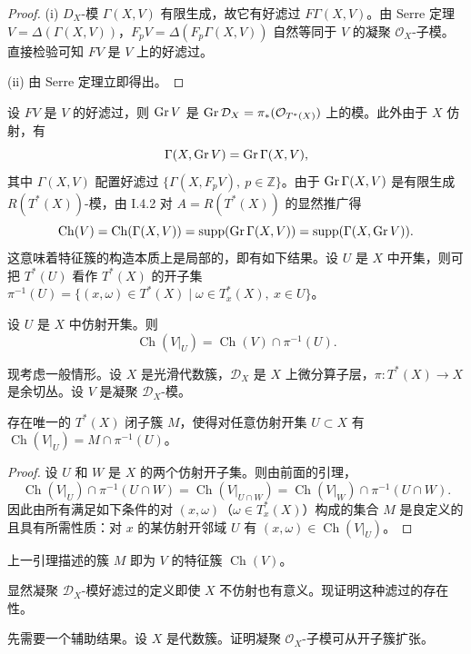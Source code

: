 \begin{proof}
(i) $D_X$-模 $\Gamma(X,V)$ 有限生成，故它有好滤过 $F\Gamma(X,V)$。由 Serre 定理 $V=\Delta(\Gamma(X,V))$，$F_pV=\Delta(F_p\Gamma(X,V))$ 自然等同于 $V$ 的凝聚 $\mathcal{O}_X$-子模。直接检验可知 $F V$ 是 $V$ 上的好滤过。

(ii) 由 Serre 定理立即得出。
\end{proof}

设 $F V$ 是 $V$ 的好滤过，则 $\operatorname{Gr} V$ 是 $\operatorname{Gr}\mathcal{D}_X=\pi_*(\mathcal{O}_{T^*(X)})$ 上的模。此外由于 $X$ 仿射，有
$$\Gamma(X,\operatorname{Gr} V)=\operatorname{Gr}\Gamma(X,V),$$
其中 $\Gamma(X,V)$ 配置好滤过 $\{\Gamma(X,F_pV),\ p\in\mathbb{Z}\}$。由于 $\operatorname{Gr}\Gamma(X,V)$ 是有限生成 $R(T^*(X))$-模，由 I.4.2 对 $A=R(T^*(X))$ 的显然推广得
$$\operatorname{Ch}(V)=\operatorname{Ch}(\Gamma(X,V))=\operatorname{supp}(\operatorname{Gr}\Gamma(X,V))=\operatorname{supp}(\Gamma(X,\operatorname{Gr} V)).$$
这意味着特征簇的构造本质上是局部的，即有如下结果。设 $U$ 是 $X$ 中开集，则可把 $T^*(U)$ 看作 $T^*(X)$ 的开子集 $\pi^{-1}(U)=\{(x,\omega)\in T^*(X)\mid \omega\in T_x^*(X),\ x\in U\}$。

\begin{lemma}
设 $U$ 是 $X$ 中仿射开集。则
$$\operatorname{Ch}(V|_U)=\operatorname{Ch}(V)\cap\pi^{-1}(U).$$
\end{lemma}

现考虑一般情形。设 $X$ 是光滑代数簇，$\mathcal{D}_X$ 是 $X$ 上微分算子层，$\pi:T^*(X)\to X$ 是余切丛。设 $V$ 是凝聚 $\mathcal{D}_X$-模。

\begin{lemma}
存在唯一的 $T^*(X)$ 闭子簇 $M$，使得对任意仿射开集 $U\subset X$ 有 $\operatorname{Ch}(V|_U)=M\cap\pi^{-1}(U)$。
\end{lemma}

\begin{proof}
设 $U$ 和 $W$ 是 $X$ 的两个仿射开子集。则由前面的引理，
$$\operatorname{Ch}(V|_U)\cap\pi^{-1}(U\cap W)=\operatorname{Ch}(V|_{U\cap W})=\operatorname{Ch}(V|_W)\cap\pi^{-1}(U\cap W).$$
因此由所有满足如下条件的对 $(x,\omega)$（$\omega\in T_x^*(X)$）构成的集合 $M$ 是良定义的且具有所需性质：对 $x$ 的某仿射开邻域 $U$ 有 $(x,\omega)\in\operatorname{Ch}(V|_U)$。
\end{proof}

上一引理描述的簇 $M$ 即为 $V$ 的特征簇 $\operatorname{Ch}(V)$。

显然凝聚 $\mathcal{D}_X$-模好滤过的定义即使 $X$ 不仿射也有意义。现证明这种滤过的存在性。

先需要一个辅助结果。设 $X$ 是代数簇。证明凝聚 $\mathcal{O}_X$-子模可从开子簇扩张。

